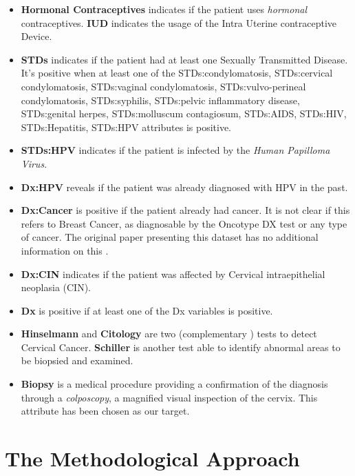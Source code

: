 \begin{itemize}
    \item \textbf{Hormonal Contraceptives} indicates if the patient uses \textit{hormonal} contraceptives. \textbf{IUD} indicates the usage of the Intra Uterine contraceptive Device.
    \item \textbf{STDs} indicates if the patient had at least one Sexually Transmitted Disease. It's positive when at least one of the STDs:condylomatosis, STDs:cervical condylomatosis, STDs:vaginal condylomatosis, STDs:vulvo-perineal condylomatosis, STDs:syphilis, STDs:pelvic inflammatory disease, STDs:genital herpes, STDs:molluscum contagiosum, STDs:AIDS, STDs:HIV, STDs:Hepatitis, STDs:HPV attributes is positive.
    \item \textbf{STDs:HPV} indicates if the patient is infected by the \textit{Human Papilloma Virus}.
    \item \textbf{Dx:HPV} reveals if the patient was already diagnosed with HPV in the past.
    \item \textbf{Dx:Cancer} is positive if the patient already had cancer. It is not clear if this refers to Breast Cancer, as diagnosable by the Oncotype DX test or any type of cancer. The original paper presenting this dataset has no additional information on this \cite{articleUCI}.
    \item \textbf{Dx:CIN} indicates if the patient was affected by Cervical intraepithelial neoplasia (CIN).
    \item \textbf{Dx} is positive if at least one of the Dx variables is positive.
    \item \textbf{Hinselmann} and \textbf{Citology} are two (complementary \cite{Duncan2004}) tests to detect Cervical Cancer. \textbf{Schiller} is another test able to identify abnormal areas to be biopsied and examined.
    \item \textbf{Biopsy} is a medical procedure providing a confirmation of the diagnosis through a \textit{colposcopy}, a magnified visual inspection of the cervix. This attribute has been chosen as our target.
\end{itemize}

\section{The Methodological Approach}

